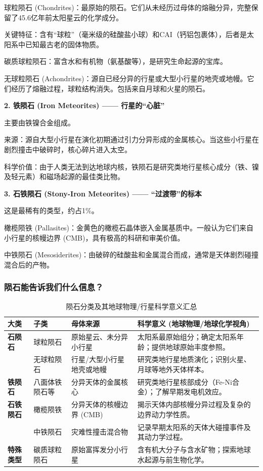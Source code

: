 \documentclass[12pt,a4paper]{article}
\begin{document}
	球粒陨石 (Chondrites)：最原始的陨石。它们从未经历过母体的熔融分异，完整保留了45.6亿年前太阳星云的化学成分。
	
	关键特征：含有“球粒”（毫米级的硅酸盐小球）和CAI（钙铝包裹体），后者是太阳系中已知最古老的固体物质。
	
	碳质球粒陨石：富含水和有机物（氨基酸等），是研究生命起源的宝库。
	
	无球粒陨石 (Achondrites)：源自已经分异的行星或大型小行星的地壳或地幔。它们经历了熔融过程，球粒结构消失。包括来自月球和火星的陨石。
	
	\textbf{2. 铁陨石 (Iron Meteorites) —— 行星的“心脏”}
	
	主要由铁镍合金组成。
	
	来源：源自大型小行星在演化初期通过引力分异形成的金属核心。当这些小行星在剧烈撞击中破碎时，核心碎片进入太空。
	
	科学价值：由于人类无法到达地球内核，铁陨石是研究类地行星核心成分（铁、镍及轻元素）和磁场起源的最佳类比物。
	
	\textbf{3. 石铁陨石 (Stony-Iron Meteorites) —— “过渡带”的标本}
	
	这是最稀有的类型，约占1\%。
	
	橄榄陨铁 (Pallasites)：金黄色的橄榄石晶体嵌入金属基质中。一般认为它们来自小行星的核幔边界 (CMB)，具有极高的科研和审美价值。
	
	中铁陨石 (Mesosiderites)：由破碎的硅酸盐和金属混合而成，通常是天体剧烈碰撞混合后的产物。
	
	\subsubsection{陨石能告诉我们什么信息？}
	\begin{table}[htbp]
		\centering
		\caption{陨石分类及其地球物理/行星科学意义汇总}
		\small
		\begin{tabularx}{\textwidth}{l l l X}
			\toprule
			大类 & 子类 & 母体来源 & 科学意义 (地球物理/地球化学视角) \\
			\midrule
			\textbf{石陨石} & 球粒陨石 & 原始星云、未分异小行星 & 太阳系最原始组分；确定太阳系年龄；提供地球原始丰度参照。 \\
			& 无球粒陨石 & 行星/大型小行星地壳或地幔 & 研究类地行星地质演化；识别火星、月球等地外天体样本。 \\
			\addlinespace
			\textbf{铁陨石} & 八面体铁陨石等 & 分异天体的金属核心 & 研究类地行星核部成分（Fe-Ni合金）；了解早期发电机效应。 \\
			\addlinespace
			\textbf{石铁陨石} & 橄榄陨铁 & 分异天体的核幔边界 (CMB) & 揭示天体内部核幔分异过程及复杂的边界动力学性质。 \\
			& 中铁陨石 & 灾难性撞击混合物 & 记录早期太阳系的天体大碰撞事件及其动力学过程。 \\
			\midrule
			\textbf{特殊类型} & 碳质球粒陨石 & 原始富挥发分小行星 & 含有机大分子与含水矿物；探索地球水起源与前生物化学。 \\
			\bottomrule
		\end{tabularx}
	\end{table}
	
\end{document}

